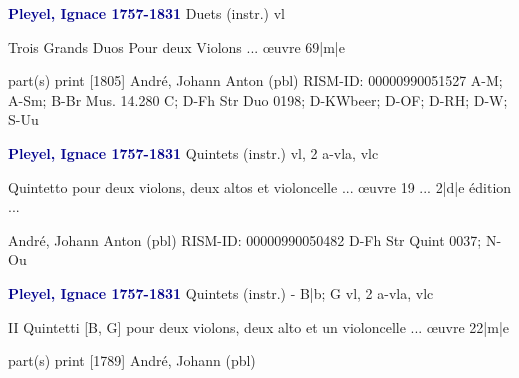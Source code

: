\documentclass[twocolumn]{book}
\begin{document}
\newline \par \vspace{7pt} \textcolor{darkblue}{\textbf{Pleyel, Ignace  1757-1831}}
\newline Duets (instr.)
 vl
\newline \begin{itshape}Trois Grands Duos Pour deux Violons ... œuvre 69|m|e\end{itshape} 
\newline \textcolor{darkblue}{}  part(s)
\newline print  [1805]
\newline André, Johann Anton  (pbl)
\newline RISM-ID: 00000990051527
\newline A-M; A-Sm; B-Br  Mus. 14.280 C; D-Fh  Str Duo 0198; D-KWbeer; D-OF; D-RH; D-W; S-Uu
\newline \par \vspace{7pt} \textcolor{darkblue}{\textbf{Pleyel, Ignace  1757-1831}}
\newline Quintets (instr.)
 vl, 2 a-vla, vlc
\newline \begin{itshape}Quintetto pour deux violons, deux altos et violoncelle ... œuvre 19 ... 2|d|e édition ...\end{itshape} 
\newline André, Johann Anton  (pbl)
\newline RISM-ID: 00000990050482
\newline D-Fh  Str Quint 0037; N-Ou
\newline \par \vspace{7pt} \textcolor{darkblue}{\textbf{Pleyel, Ignace  1757-1831}}
\newline Quintets (instr.) - B|b; G
 vl, 2 a-vla, vlc
\newline \begin{itshape}II Quintetti [B, G] pour deux violons, deux alto et un violoncelle ... œuvre 22|m|e\end{itshape} 
\newline \textcolor{darkblue}{}  part(s)
\newline print  [1789]
\newline André, Johann  (pbl)
\end{document}
